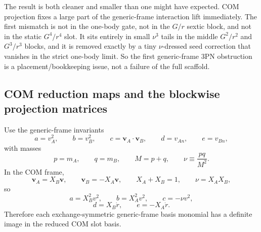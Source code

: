 \documentclass[11pt]{article}
\begin{document}
The result is both cleaner and smaller than one might have expected.  COM
projection fixes a large part of the generic-frame interaction lift
immediately.  The first mismatch is not in the one-body gate, not in the
$G/r$ sextic block, and not in the static $G^4/r^4$ slot.  It sits entirely in
small $\nu^3$ tails in the middle $G^2/r^2$ and $G^3/r^3$ blocks, and it is
removed exactly by a tiny $\nu$-dressed seed correction that vanishes in the
strict one-body limit.  So the first generic-frame $3$PN obstruction is a
placement/bookkeeping issue, not a failure of the full scaffold.

\subsection{COM reduction maps and the blockwise projection matrices}
\label{app:com-projection-maps}

Use the generic-frame invariants
\begin{equation}
 a=v_A^2,
 \qquad
 b=v_B^2,
 \qquad
 c=\mathbf v_A\!\cdot\!\mathbf v_B,
 \qquad
 d=v_{An},
 \qquad
 e=v_{Bn},
\label{eq:app-com-proj-abcde}
\end{equation}
with masses
\begin{equation}
 p=m_A,
 \qquad
 q=m_B,
 \qquad
 M=p+q,
 \qquad
 \nu\equiv\frac{pq}{M^2}.
\label{eq:app-com-proj-pqnu}
\end{equation}
In the COM frame,
\begin{equation}
\mathbf v_A=X_B\mathbf v,
\qquad
\mathbf v_B=-X_A\mathbf v,
\qquad
X_A+X_B=1,
\qquad
\nu=X_AX_B,
\label{eq:app-com-proj-XAXB}
\end{equation}
so
\begin{equation}
 a=X_B^2v^2,
 \qquad
 b=X_A^2v^2,
 \qquad
 c=-\nu v^2,
\label{eq:app-com-proj-abc}
\end{equation}
\begin{equation}
 d=X_B\dot r,
 \qquad
 e=-X_A\dot r.
\label{eq:app-com-proj-de}
\end{equation}
Therefore each exchange-symmetric generic-frame basis monomial has a definite
image in the reduced COM slot basis.
\end{document}
